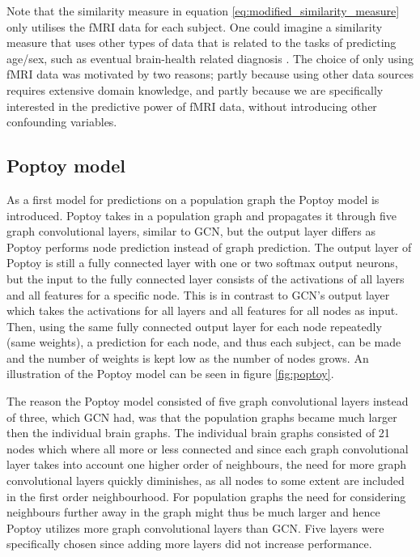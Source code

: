 Note that the similarity measure in equation \eqref{eq:modified_similarity_measure} only utilises the fMRI data for each subject. One could imagine a similarity measure that uses other types of data that is related to the tasks of predicting age/sex, such as eventual brain-health related diagnosis \cite{stankeviciute}. The choice of only using fMRI data was motivated by two reasons; partly because using other data sources requires extensive domain knowledge, and partly because we are specifically interested in the predictive power of fMRI data, without introducing other confounding variables.

\subsection{Poptoy model}
As a first model for predictions on a population graph the Poptoy model is introduced. Poptoy takes in a population graph and propagates it through five graph convolutional layers, similar to GCN, but the output layer differs as Poptoy performs node prediction instead of graph prediction. The output layer of Poptoy is still a fully connected layer with one or two softmax output neurons, but the input to the fully connected layer consists of the activations of all layers and all features for a specific node. This is in contrast to GCN's output layer which takes the activations for all layers and all features for all nodes as input. Then, using the same fully connected output layer for each node repeatedly (same weights), a prediction for each node, and thus each subject, can be made and the number of weights is kept low as the number of nodes grows. An illustration of the Poptoy model can be seen in figure \ref{fig:poptoy}.

The reason the Poptoy model consisted of five graph convolutional layers instead of three, which GCN had, was that the population graphs became much larger then the individual brain graphs. The individual brain graphs consisted of 21 nodes which where all more or less connected and since each graph convolutional layer takes into account one higher order of neighbours, the need for more graph convolutional layers quickly diminishes, as all nodes to some extent are included in the first order neighbourhood. For population graphs the need for considering neighbours further away in the graph might thus be much larger and hence Poptoy utilizes more graph convolutional layers than GCN. Five layers were specifically chosen since adding more layers did not increase performance.

